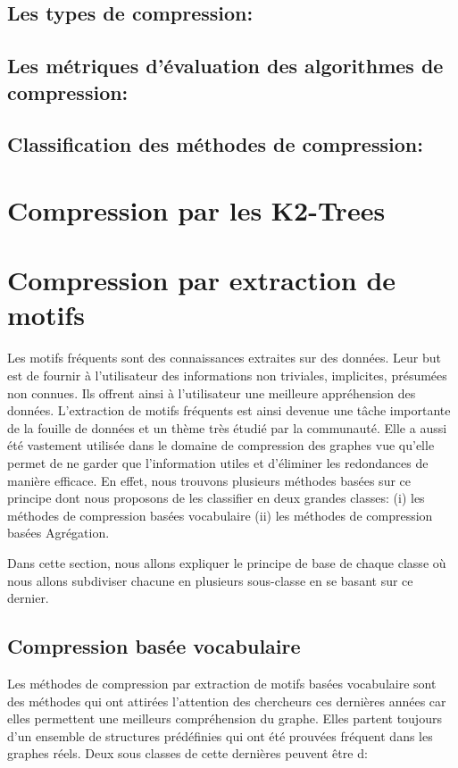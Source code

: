 \documentclass[a4paper,oneside,12pt]{report}
\theoremstyle{definition}
\begin{document}
			\subsection{Les types de compression:}
			
			
	
			\subsection{Les métriques d'évaluation des algorithmes de compression:}
				
			
			\subsection{Classification des méthodes de compression:}
				
			\section{Compression par les K2-Trees}
				
				
			\section{Compression par extraction de motifs}
			 Les motifs fréquents sont des connaissances extraites sur des données. Leur but est de fournir à l'utilisateur des informations non triviales, implicites, présumées non connues. Ils offrent ainsi à l'utilisateur une meilleure appréhension des données. L'extraction de motifs fréquents est ainsi devenue une tâche importante de la fouille de données et un thème très étudié par la communauté. Elle a aussi été vastement%
			 utilisée dans le domaine de compression des graphes vue qu'elle permet de ne garder que l'information utiles et d'éliminer les redondances de manière efficace. En effet, nous trouvons plusieurs méthodes basées sur ce principe dont nous proposons de les classifier en deux grandes classes: 
			 (i) les méthodes  de compression basées vocabulaire
			 (ii) les méthodes  de compression basées Agrégation.
			 
				Dans cette section, nous allons expliquer le principe de base de chaque classe où nous allons subdiviser chacune  en plusieurs sous-classe en se basant sur ce dernier. 
			 
				\subsection{Compression basée vocabulaire}
				Les méthodes de compression par extraction de motifs basées vocabulaire sont des méthodes qui ont attirées l'attention des chercheurs ces dernières années car elles permettent une meilleurs compréhension du graphe. Elles partent toujours d'un ensemble de structures prédéfinies qui ont été prouvées fréquent dans les graphes réels. Deux sous classes de cette dernières peuvent être d:
				 
\end{document}
